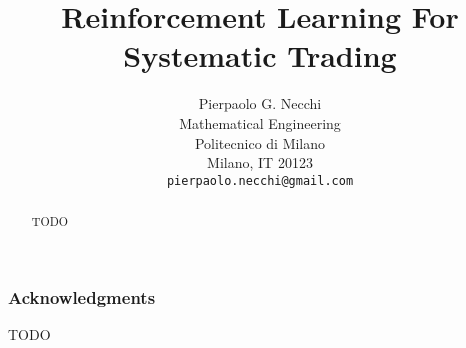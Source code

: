 \documentclass{article} %
\title{Reinforcement Learning For Systematic Trading}
\author{%
Pierpaolo G. Necchi\\
Mathematical Engineering\\
Politecnico di Milano\\
Milano, IT 20123 \\
\texttt{pierpaolo.necchi@gmail.com}
}
\begin{document}
\maketitle

\begin{abstract}
TODO
\end{abstract}


\clearpage










\subsubsection*{Acknowledgments}

TODO

\clearpage


\end{document}
